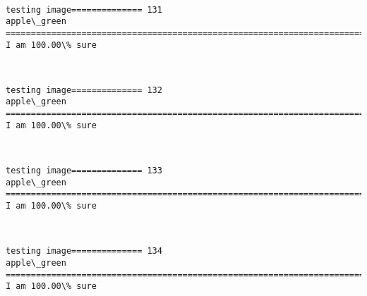 \documentclass[11pt]{article}
\begin{document}
    \begin{center}
    \end{center}
    { \hspace*{\fill} \\}
    
    \begin{Verbatim}[commandchars=\\\{\}]
testing image============== 131
apple\_green
============================================================================
I am 100.00\% sure

    \end{Verbatim}

    \begin{center}
    \end{center}
    { \hspace*{\fill} \\}
    
    \begin{Verbatim}[commandchars=\\\{\}]
testing image============== 132
apple\_green
============================================================================
I am 100.00\% sure

    \end{Verbatim}

    \begin{center}
    \end{center}
    { \hspace*{\fill} \\}
    
    \begin{Verbatim}[commandchars=\\\{\}]
testing image============== 133
apple\_green
============================================================================
I am 100.00\% sure

    \end{Verbatim}

    \begin{center}
    \end{center}
    { \hspace*{\fill} \\}
    
    \begin{Verbatim}[commandchars=\\\{\}]
testing image============== 134
apple\_green
============================================================================
I am 100.00\% sure

    \end{Verbatim}
\end{document}
